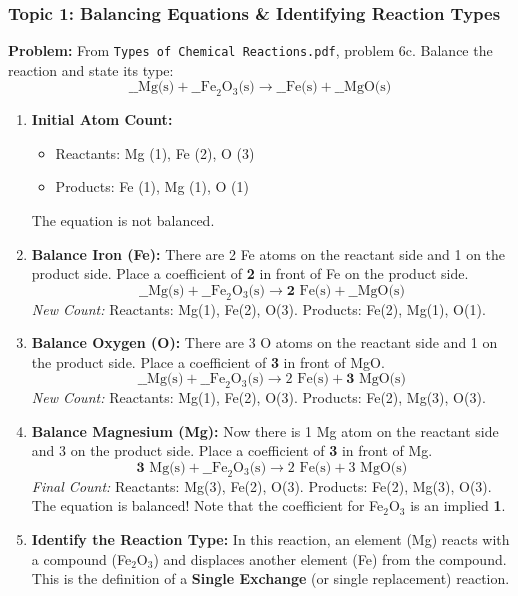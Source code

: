 \documentclass{article}
\begin{document}
\subsubsection*{Topic 1: Balancing Equations \& Identifying Reaction Types}
\textbf{Problem:} From \texttt{Types of Chemical Reactions.pdf}, problem 6c. Balance the reaction and state its type:
\[ \text{\_\_ Mg(s)} + \text{\_\_ Fe}_2\text{O}_3\text{(s)} \rightarrow \text{\_\_ Fe(s)} + \text{\_\_ MgO(s)} \]
\begin{enumerate}
    \item \textbf{Initial Atom Count:}
    \begin{itemize}
        \item Reactants: Mg (1), Fe (2), O (3)
        \item Products: Fe (1), Mg (1), O (1)
    \end{itemize}
    The equation is not balanced.

    \item \textbf{Balance Iron (Fe):} There are 2 Fe atoms on the reactant side and 1 on the product side. Place a coefficient of \textbf{2} in front of Fe on the product side.
    \[ \text{\_\_ Mg(s)} + \text{\_\_ Fe}_2\text{O}_3\text{(s)} \rightarrow \mathbf{2}\text{ Fe(s)} + \text{\_\_ MgO(s)} \]
    \textit{New Count:} Reactants: Mg(1), Fe(2), O(3). Products: Fe(2), Mg(1), O(1).

    \item \textbf{Balance Oxygen (O):} There are 3 O atoms on the reactant side and 1 on the product side. Place a coefficient of \textbf{3} in front of MgO.
    \[ \text{\_\_ Mg(s)} + \text{\_\_ Fe}_2\text{O}_3\text{(s)} \rightarrow 2\text{ Fe(s)} + \mathbf{3}\text{ MgO(s)} \]
    \textit{New Count:} Reactants: Mg(1), Fe(2), O(3). Products: Fe(2), Mg(3), O(3).

    \item \textbf{Balance Magnesium (Mg):} Now there is 1 Mg atom on the reactant side and 3 on the product side. Place a coefficient of \textbf{3} in front of Mg.
    \[ \mathbf{3}\text{ Mg(s)} + \text{\_\_ Fe}_2\text{O}_3\text{(s)} \rightarrow 2\text{ Fe(s)} + 3\text{ MgO(s)} \]
    \textit{Final Count:} Reactants: Mg(3), Fe(2), O(3). Products: Fe(2), Mg(3), O(3). The equation is balanced! Note that the coefficient for Fe$_2$O$_3$ is an implied \textbf{1}.

    \item \textbf{Identify the Reaction Type:} In this reaction, an element (Mg) reacts with a compound (Fe$_2$O$_3$) and displaces another element (Fe) from the compound. This is the definition of a \textbf{Single Exchange} (or single replacement) reaction.
\end{enumerate}
\end{document}
